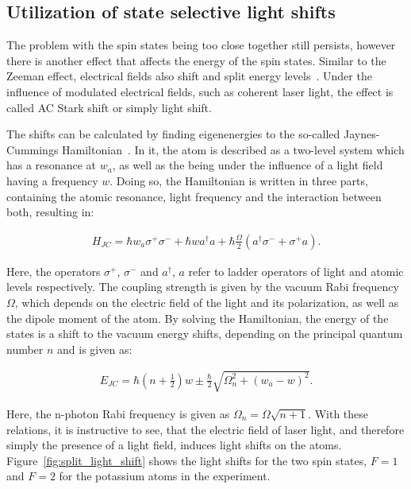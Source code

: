 \subsection{Utilization of state selective light shifts}

The problem with the spin states being too close together still persists, however there is another effect that affects the energy of the spin states. Similar to the Zeeman effect, electrical fields also shift and split energy levels~\cite{Voigt, Courtney1995}. Under the influence of modulated electrical fields, such as coherent laser light, the effect is called AC Stark shift or simply light shift.

The shifts can be calculated by finding eigenenergies to the so-called Jaynes-Cummings Hamiltonian~\cite{Fox2006}. In it, the atom is described as a two-level system which has a resonance at $w_a$, as well as the being under the influence of a light field having a frequency $w$. Doing so, the Hamiltonian is written in three parts, containing the atomic resonance, light frequency and the interaction between both, resulting in:

\begin{align}
	H_{JC} = \hbar w_a \sigma^+ \sigma^- + \hbar w a^\dagger a + \hbar \frac{\Omega}{2}\left(a^\dagger \sigma^- + \sigma^+ a\right).
\end{align}

Here, the operators $\sigma^+$, $\sigma^-$ and $a^\dagger$, $a$ refer to ladder operators of light and atomic levels respectively. The coupling strength is given by the vacuum Rabi frequency $\Omega$, which depends on the electric field of the light and its polarization, as well as the dipole moment of the atom.
By solving the Hamiltonian, the energy of the states is a shift to the vacuum energy shifts, depending on the principal quantum number $n$ and is given as:

\begin{align}
	E_{JC} = \hbar \left(n + \frac{1}{2} \right) w \pm \frac{\hbar}{2} \sqrt{\Omega_n^2 + {\left(w_a - w\right)}^2}.
\end{align}

Here, the n-photon Rabi frequency is given as $\Omega_n = \Omega\sqrt{n+1}$. With these relations, it is instructive to see, that the electric field of laser light, and therefore simply the presence of a light field, induces light shifts on the atoms. Figure~\ref{fig:split_light_shift} shows the light shifts for the two spin states, $F=1$ and $F=2$ for the potassium atoms in the experiment.

